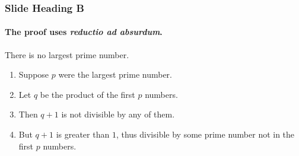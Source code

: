 \documentclass{beamer}
\begin{document}

\begin{frame} 
\frametitle{Slide Heading B} 
\framesubtitle{The proof uses \textit{reductio ad absurdum}.} 

\begin{theorem}
There is no largest prime number. \end{theorem} 
\begin{enumerate} 
\item<1-| alert@1> Suppose $p$ were the largest prime number. 
\item<2-> Let $q$ be the product of the first $p$ numbers. 
\item<3-> Then $q+1$ is not divisible by any of them. 
\item<1-> But $q + 1$ is greater than $1$, thus divisible by some prime
number not in the first $p$ numbers.
\end{enumerate}

\end{frame}

\end{document}
